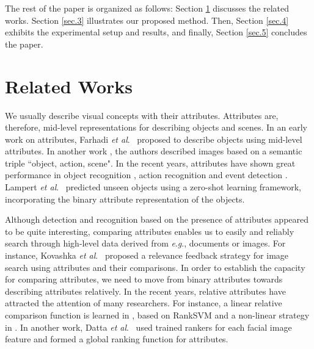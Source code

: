 \documentclass[runningheads]{llncs}
\newcommand{\etal}{\textit{et al}.}
\newcommand{\eg}{\textit{e}.\textit{g}.}
\begin{document}
The rest of the paper is organized as follows: Section \ref{sec.2} discusses the related works. Section \ref{sec.3} illustrates our proposed method. Then, Section \ref{sec.4} exhibits the experimental setup and results, and finally, Section \ref{sec.5} concludes the paper.


\section{Related Works}
\label{sec.2}

We usually describe visual concepts with their attributes. %
Attributes are, therefore, mid-level representations for describing objects and scenes. In an early work on attributes, Farhadi \etal~\cite{Farhadi09describingobjects} proposed to describe objects using mid-level attributes. In another work \cite{Farhadi2010EveryPT}, the authors described images based on %
a semantic triple ``object, action, scene". In the recent years, attributes have shown great performance in object recognition \cite{Farhadi09describingobjects,7298613}, action recognition \cite{6838985,5995353} and event detection \cite{6475038}. Lampert \etal~\cite{6571196} predicted unseen objects using a zero-shot learning framework, incorporating the binary attribute representation of the objects. %

Although detection and recognition based on the presence of attributes appeared to be quite interesting, comparing attributes enables us to easily and reliably search through high-level data derived from \eg, documents or images. For instance, Kovashka \etal~\cite{KovashkaG13} proposed a relevance feedback strategy for image search using attributes and their comparisons. In order to establish the capacity for comparing attributes, we need to move from binary attributes towards describing attributes relatively. In the recent years, relative attributes have attracted the attention of many researchers.
For instance, a linear relative comparison function is learned in \cite{parikh2011}, based on RankSVM \cite{Joachims2002} and a non-linear strategy in \cite{Li2012RelativeFF}. In another work, Datta \etal~\cite{5771429} used trained rankers for each facial image feature and formed a global ranking function for attributes.
\end{document}
